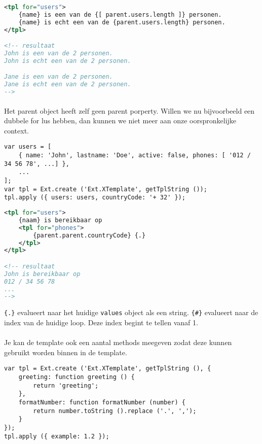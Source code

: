 \begin{lstlisting}[language=xml]
<tpl for="users">
	{name} is een van de {[ parent.users.length ]} personen.
	{name} is echt een van de {parent.users.length} personen.
</tpl>

<!-- resultaat
John is een van de 2 personen.
John is echt een van de 2 personen.

Jane is een van de 2 personen.
Jane is echt een van de 2 personen.
-->
\end{lstlisting}

\paragraph {} Het parent object heeft zelf geen parent porperty. Willen we nu bijvoorbeeld
een dubbele for lus hebben, dan kunnen we niet meer aan onze oorspronkelijke context.

\begin{lstlisting}[language=ownjavascript]
var users = [
	{ name: 'John', lastname: 'Doe', active: false, phones: [ '012 / 34 56 78', ...] },
	...
];
var tpl = Ext.create ('Ext.XTemplate', getTplString ());
tpl.apply ({ users: users, countryCode: '+ 32' });
\end{lstlisting}

\begin{lstlisting}[language=xml]
<tpl for="users">
	{naam} is bereikbaar op
	<tpl for="phones">
		{parent.parent.countryCode} {.}
	</tpl>
</tpl>

<!-- resultaat
John is bereikbaar op
012 / 34 56 78
...
-->
\end{lstlisting}

\lstinline|{.}| evalueert naar het huidige \lstinline{values} object als een string.
\lstinline|{#}| evalueert naar de index van de huidige loop. Deze index begint te tellen
vanaf 1.

\paragraph {} Je kan de template ook een aantal methods meegeven zodat deze kunnen
gebruikt worden binnen in de template.

\begin{lstlisting}[language=ownjavascript]
var tpl = Ext.create ('Ext.XTemplate', getTplString (), {
	greeting: function greeting () {
		return 'greeting';
	},
	formatNumber: function formatNumber (number) {
		return number.toString ().replace ('.', ',');
	}
});
tpl.apply ({ example: 1.2 });
\end{lstlisting}


